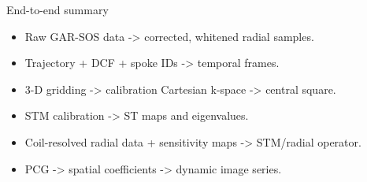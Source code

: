 \documentclass[aspectratio=169,professionalfonts]{beamer}
\begin{document}
\begin{frame}{End-to-end summary}
\begin{itemize}
\item Raw GAR-SOS data -> corrected, whitened radial samples.
\item Trajectory + DCF + spoke IDs -> temporal frames.
\item 3-D gridding -> calibration Cartesian k-space -> central square.
\item STM calibration -> ST maps and eigenvalues.
\item Coil-resolved radial data + sensitivity maps -> STM/radial operator.
\item PCG -> spatial coefficients -> dynamic image series.
\end{itemize}
\end{frame}
\end{document}
